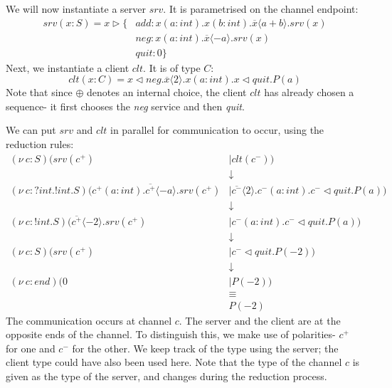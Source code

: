 \documentclass[a4paper, openany]{memoir}
\theoremstyle{definition}
\begin{document}
    We will now instantiate a server $srv$. It is parametrised on the channel endpoint:
    \begin{align*}
        srv(x \colon S) = x \vartriangleright \{ &\textit{add} \colon x(a \colon \textit{int}). x(b \colon\textit{int}). \overline{x} \langle a + b \rangle. srv(x) \\
        & \textit{neg} \colon x(a \colon \textit{int}). \overline{x}\langle -a \rangle. srv(x) \\
        & \textit{quit} \colon 0 \}
    \end{align*}
    Next, we instantiate a client $clt$. It is of type $C$:
    \[clt(x \colon C) = x \vartriangleleft \textit{neg}.\overline{x} \langle 2 \rangle.x(a \colon \textit{int}).x \vartriangleleft \textit{quit}.P(a)\]
    Note that since $\oplus$ denotes an internal choice, the client $clt$ has already chosen a sequence- it first chooses the \textit{neg} service and then \textit{quit}.

    We can put $srv$ and $clt$ in parallel for communication to occur, using the reduction rules:
    \begin{align*}
        (\nu \ c \colon S)(srv(c^+) &\mid clt(c^-)) \\
        &\downarrow \\
        (\nu \ c \colon ?\textit{int}.!\textit{int}.S)(c^+(a \colon \textit{int}).\overline{c^+}\langle -a \rangle.srv(c^+) &\mid \overline{c^-}\langle 2 \rangle. c^-(a \colon \textit{int}).c^{-} \vartriangleleft \textit{quit}.P(a)) \\
        &\downarrow \\
        (\nu \ c \colon !\textit{int}.S)(\overline{c^+}\langle -2 \rangle.srv(c^+) &\mid c^-(a \colon \textit{int}). c^- \vartriangleleft \textit{quit}.P(a)) \\
        &\downarrow \\
        (\nu \ c \colon S)(srv(c^+) &\mid c^- \vartriangleleft \textit{quit}.P(-2)) \\
        &\downarrow \\
        (\nu \ c \colon \textit{end})(0 &\mid P(-2)) \\
        &\equiv \\
        & P(-2)
    \end{align*}
    The communication occurs at channel $c$. The server and the client are at the opposite ends of the channel. To distinguish this, we make use of polarities- $c^+$ for one and $c^-$ for the other. We keep track of the type using the server; the client type could have also been used here. Note that the type of the channel $c$ is given as the type of the server, and changes during the reduction process.
\end{document}
